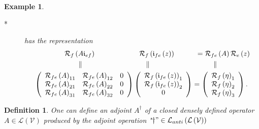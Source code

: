 \documentclass[aps,preprint]{revtex4}%
\newtheorem{definition}[theorem]{Definition}
\newtheorem{example}[theorem]{Example}
\begin{document}
\begin{example}
\begin{enumerate}
\begin{enumerate}
\begin{description}
\item[*] has the representation
\begin{align}
&  \left.  \qquad\qquad\mathcal{R}_{f}\left(  A\mathfrak{i}_{ef}\right)
\right.  \qquad\qquad\quad\quad\mathcal{R}_{f}\left(  \mathfrak{i}_{fe}\left(
z\right)  \right)  \qquad\quad=\mathcal{R}_{fe}\left(  A\right)
\mathcal{R}_{e}\left(  z\right) \\
&  \qquad\qquad\qquad\parallel\qquad\qquad\qquad\quad\qquad\parallel
\qquad\qquad\qquad\qquad\quad\parallel\qquad\qquad\\
&  \left(
\begin{array}
[c]{ccc}%
\mathcal{R}_{fe}\left(  A\right)  _{11} & \mathcal{R}_{fe}\left(  A\right)
_{12} & 0\\
\mathcal{R}_{fe}\left(  A\right)  _{21} & \mathcal{R}_{fe}\left(  A\right)
_{22} & 0\\
\mathcal{R}_{fe}\left(  A\right)  _{31} & \mathcal{R}_{fe}\left(  A\right)
_{32} & 0
\end{array}
\right)  \left(
\begin{array}
[c]{c}%
\mathcal{R}_{f}\left(  \mathfrak{i}_{fe}\left(  z\right)  \right)  _{1}\\
\mathcal{R}_{f}\left(  \mathfrak{i}_{fe}\left(  z\right)  \right)  _{2}\\
0
\end{array}
\right)  =\left(
\begin{array}
[c]{c}%
\mathcal{R}_{f}\left(  \eta\right)  _{1}\\
\mathcal{R}_{f}\left(  \eta\right)  _{2}\\
\mathcal{R}_{f}\left(  \eta\right)  _{3}%
\end{array}
\right)  .
\end{align}

\end{description}
\end{enumerate}
\end{enumerate}
\end{example}

\begin{definition}
One can define an adjoint $A^{\dagger}$ of a closed densely defined operator
$A\in\mathcal{L}\left(  \mathcal{V}\right)  $ produced by the adjoint
operation "$\dagger"\in\mathcal{L}_{anti}\left(  \mathcal{L}\left(
\mathcal{V}\right)  \right)  $
\end{definition}
\end{document}
